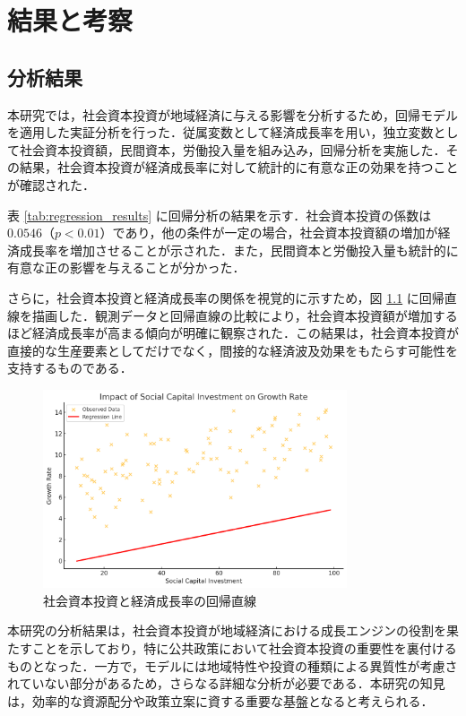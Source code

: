 \chapter{結果と考察}

\section{分析結果}

本研究では，社会資本投資が地域経済に与える影響を分析するため，回帰モデルを適用した実証分析を行った．従属変数として経済成長率を用い，独立変数として社会資本投資額，民間資本，労働投入量を組み込み，回帰分析を実施した．その結果，社会資本投資が経済成長率に対して統計的に有意な正の効果を持つことが確認された．

表 \ref{tab:regression_results} に回帰分析の結果を示す．社会資本投資の係数は \( 0.0546 \)（\( p < 0.01 \)）であり，他の条件が一定の場合，社会資本投資額の増加が経済成長率を増加させることが示された．また，民間資本と労働投入量も統計的に有意な正の影響を与えることが分かった．

さらに，社会資本投資と経済成長率の関係を視覚的に示すため，図 \ref{fig:regression_plot} に回帰直線を描画した．観測データと回帰直線の比較により，社会資本投資額が増加するほど経済成長率が高まる傾向が明確に観察された．この結果は，社会資本投資が直接的な生産要素としてだけでなく，間接的な経済波及効果をもたらす可能性を支持するものである．



\begin{figure}[!ht]
	\centering
	\includegraphics[width=0.8\textwidth]{figure/figure_sample.png}
	\caption{社会資本投資と経済成長率の回帰直線}
	\label{fig:regression_plot}
\end{figure}

本研究の分析結果は，社会資本投資が地域経済における成長エンジンの役割を果たすことを示しており，特に公共政策において社会資本投資の重要性を裏付けるものとなった．一方で，モデルには地域特性や投資の種類による異質性が考慮されていない部分があるため，さらなる詳細な分析が必要である．本研究の知見は，効率的な資源配分や政策立案に資する重要な基盤となると考えられる．

